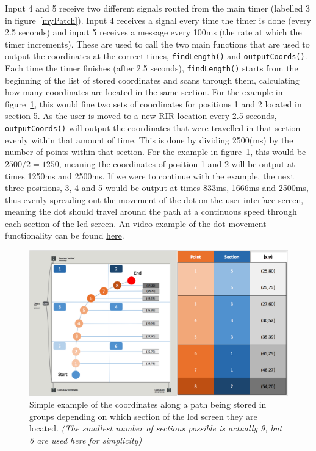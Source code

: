 \documentclass[../../main.tex]{subfiles}
\begin{document}
			Input 4 and 5 receive two different signals routed from the main timer (labelled 3 in figure~\ref{myPatch}). Input 4 receives a signal every time the timer is done (every 2.5 seconds) and input 5 receives a message every 100ms (the rate at which the timer increments). These are used to call the two main functions that are used to output the coordinates at the correct times, \texttt{findLength()} and \texttt{outputCoords()}. Each time the timer finishes (after 2.5 seconds), \texttt{findLength()} starts from the beginning of the list of stored coordinates and scans through them, calculating how many coordinates are located in the same section. For the example in figure~\ref{locationsExample}, this would fine two sets of coordinates for positions 1 and 2 located in section 5. As the user is moved to a new \ac{RIR} location every 2.5 seconds, \texttt{outputCoords()} will output the coordinates that were travelled in that section evenly within that amount of time. This is done by dividing 2500(ms) by the number of points within that section. For the example in figure~\ref{locationsExample}, this would be $2500/2 = 1250$, meaning the coordinates of position 1 and 2 will be output at times 1250ms and 2500ms. If we were to continue with the example, the next three positions, 3, 4 and 5 would be output at times 833ms, 1666ms and 2500ms, thus evenly spreading out the movement of the dot on the user interface screen, meaning the dot should travel around the path at a continuous speed through each section of the lcd screen. An video example of the dot movement functionality can be found \href{http://lt669.github.io/pages/videos.html}{here}.

			\begin{figure}
				\centerline{\includegraphics[width=\textwidth]{Sections/Implementation/Max/images/Max/UserInterface/locationsExample2.png}}
				\caption{Simple example of the coordinates along a path being stored in groups depending on which section of the lcd screen they are located. \textit{(The smallest number of sections possible is actually 9, but 6 are used here for simplicity)}}
				\label{locationsExample}
			\end{figure}
\end{document}
